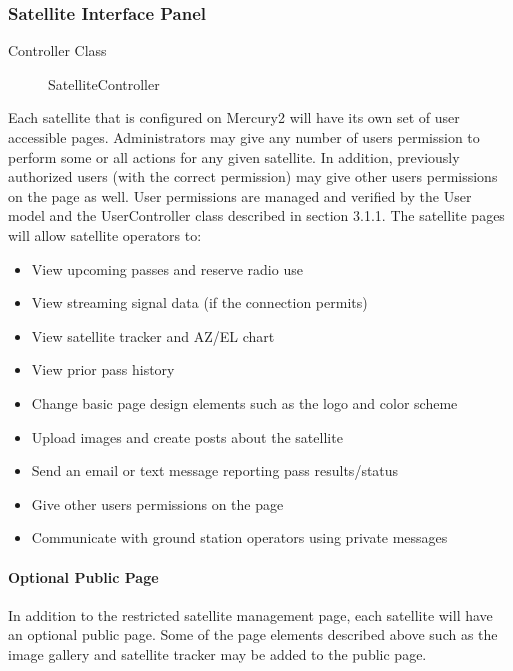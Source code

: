 \documentclass{mxl-note}
\begin{document}
\subsubsection{Satellite Interface Panel}
\begin{description}
	\item [Controller Class]SatelliteController
\end{description}
Each satellite that is configured on Mercury2 will have its own set of user accessible pages. Administrators may give any number of users permission to perform some or all actions for any given satellite. In addition, previously authorized users (with the correct permission) may give other users permissions on the page as well. User permissions are managed and verified by the User model and the UserController class described in section 3.1.1. The satellite pages will allow satellite operators to:
\begin{itemize}
	\item View upcoming passes and reserve radio use
	\item View streaming signal data (if the connection permits)
	\item View satellite tracker and AZ/EL chart
	\item View prior pass history
	\item Change basic page design elements such as the logo and color scheme
	\item Upload images and create posts about the satellite
	\item Send an email or text message reporting pass results/status
	\item Give other users permissions on the page
	\item Communicate with ground station operators using private messages
\end{itemize}

\paragraph{Optional Public Page}
In addition to the restricted satellite management page, each satellite will have an optional public page. Some of the page elements described above such as the image gallery and satellite tracker may be added to the public page.
\end{document}
